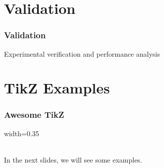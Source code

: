 \documentclass[8pt, hyperref={bookmarks=false},aspectratio=169, xcolor=table]{beamer}
\begin{document}
\section{Validation}
\begin{frame}\frametitle{Validation}
  Experimental verification and performance analysis
\end{frame}

\section{TikZ Examples}

\begin{frame}\frametitle{Awesome TikZ}
  \centering
  \begin{adjustbox}{width=0.35\linewidth}
  \end{adjustbox}\\
  \vspace{0.1cm}
  \large In the next slides, we will see some examples.
\end{frame}

\end{document}
